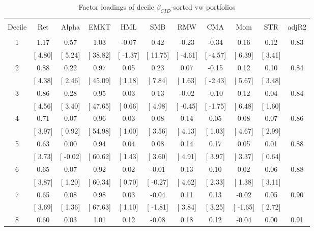 \documentclass[12pt]{article}
\begin{document}
\begin{table}[!htbp] \centering 
  \caption{Factor loadings of decile $\beta_{CID}$-sorted vw portfolios} 
  \label{} 
\begin{tabular}{@{\extracolsep{0pt}} ccccccccccc} 
\\[-1.8ex]\hline 
\hline \\[-1.8ex] 
Decile & Ret & Alpha & EMKT & HML & SMB & RMW & CMA & Mom & STR & adjR2 \\ 
\hline \\[-1.8ex] 
1 & 1.17 & 0.57 & 1.03 & -0.07 & 0.42 & -0.23 & -0.34 & 0.16 & 0.12 & 0.83 \\ 
 & [ 4.80] & [ 5.24] & [ 38.82] & [ -1.37] & [ 11.75] & [ -4.61] & [ -4.57] & [ 6.39] & [ 3.41] &  \\ 
2 & 0.88 & 0.22 & 0.97 & 0.05 & 0.23 & 0.07 & -0.15 & 0.12 & 0.10 & 0.84 \\ 
 & [ 4.38] & [ 2.46] & [ 45.09] & [ 1.18] & [ 7.84] & [ 1.63] & [ -2.43] & [ 5.67] & [ 3.48] &  \\ 
3 & 0.86 & 0.28 & 0.95 & 0.03 & 0.13 & -0.02 & -0.10 & 0.12 & 0.04 & 0.84 \\ 
 & [ 4.56] & [ 3.40] & [ 47.65] & [ 0.66] & [ 4.98] & [ -0.45] & [ -1.75] & [ 6.48] & [ 1.60] &  \\ 
4 & 0.71 & 0.07 & 0.96 & 0.03 & 0.08 & 0.14 & 0.05 & 0.08 & 0.07 & 0.86 \\ 
 & [ 3.97] & [ 0.92] & [ 54.98] & [ 1.00] & [ 3.56] & [ 4.13] & [ 1.03] & [ 4.67] & [ 2.99] &  \\ 
5 & 0.63 & 0.00 & 0.94 & 0.04 & 0.08 & 0.14 & 0.17 & 0.05 & 0.01 & 0.88 \\ 
 & [ 3.73] & [ -0.02] & [ 60.62] & [ 1.43] & [ 3.60] & [ 4.91] & [ 3.97] & [ 3.37] & [ 0.64] &  \\ 
6 & 0.65 & 0.07 & 0.92 & 0.02 & -0.01 & 0.13 & 0.10 & 0.02 & 0.06 & 0.88 \\ 
 & [ 3.87] & [ 1.20] & [ 60.34] & [ 0.70] & [ -0.27] & [ 4.62] & [ 2.33] & [ 1.38] & [ 3.11] &  \\ 
7 & 0.65 & 0.08 & 0.98 & 0.03 & -0.04 & 0.11 & 0.13 & -0.02 & 0.05 & 0.90 \\ 
 & [ 3.69] & [ 1.36] & [ 67.63] & [ 1.10] & [ -1.81] & [ 3.84] & [ 3.25] & [ -1.65] & [ 2.72] &  \\ 
8 & 0.60 & 0.03 & 1.01 & 0.12 & -0.08 & 0.18 & 0.12 & -0.04 & 0.00 & 0.91 \\ 

\end{tabular}
\end{table}
\end{document}

